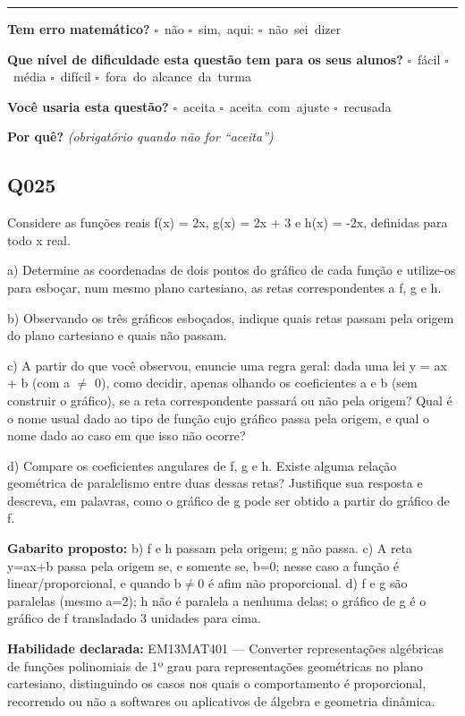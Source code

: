 \documentclass[11pt,a4paper]{article}
\begin{document}
\noindent\rule{\linewidth}{0.4pt}
\textbf{Tem erro matemático?}\quad
\mbox{$\square$~não} \quad \mbox{$\square$~sim, aqui:} \underline{\hspace{5cm}}
\quad \mbox{$\square$~não sei dizer}

\textbf{Que nível de dificuldade esta questão tem para os seus alunos?}\quad
\mbox{$\square$~fácil} \quad \mbox{$\square$~média} \quad
\mbox{$\square$~difícil} \quad \mbox{$\square$~fora do alcance da turma}

\textbf{Você usaria esta questão?}\quad
\mbox{$\square$~aceita} \quad \mbox{$\square$~aceita com ajuste} \quad
\mbox{$\square$~recusada}

\textbf{Por quê?} \emph{(obrigatório quando não for ``aceita'')}

\underline{\hspace{\linewidth}}

\underline{\hspace{\linewidth}}
\vspace{0.6em}

\begin{samepage}
\subsection*{Q025}
Considere as funções reais f(x) = 2x, g(x) = 2x + 3 e h(x) = -2x, definidas para todo x real.

a) Determine as coordenadas de dois pontos do gráfico de cada função e utilize-os para esboçar, num mesmo plano cartesiano, as retas correspondentes a f, g e h.

b) Observando os três gráficos esboçados, indique quais retas passam pela origem do plano cartesiano e quais não passam.

c) A partir do que você observou, enuncie uma regra geral: dada uma lei y = ax + b (com a $\neq$ 0), como decidir, apenas olhando os coeficientes a e b (sem construir o gráfico), se a reta correspondente passará ou não pela origem? Qual é o nome usual dado ao tipo de função cujo gráfico passa pela origem, e qual o nome dado ao caso em que isso não ocorre?

d) Compare os coeficientes angulares de f, g e h. Existe alguma relação geométrica de paralelismo entre duas dessas retas? Justifique sua resposta e descreva, em palavras, como o gráfico de g pode ser obtido a partir do gráfico de f.

\textbf{Gabarito proposto:} b) f e h passam pela origem; g não passa. c) A reta y=ax+b passa pela origem se, e somente se, b=0; nesse caso a função é linear/proporcional, e quando b$\neq$0 é afim não proporcional. d) f e g são paralelas (mesmo a=2); h não é paralela a nenhuma delas; o gráfico de g é o gráfico de f transladado 3 unidades para cima.

\textbf{Habilidade declarada:} EM13MAT401 --- Converter representações algébricas de funções polinomiais de 1º grau para representações geométricas no plano cartesiano, distinguindo os casos nos quais o comportamento é proporcional, recorrendo ou não a softwares ou aplicativos de álgebra e geometria dinâmica.
\end{samepage}
\end{document}
